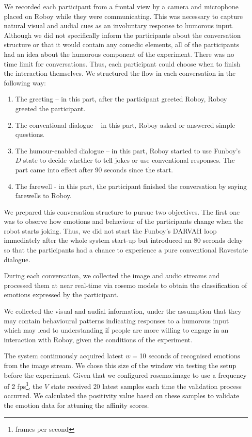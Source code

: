 We recorded each participant from a frontal view by a camera and microphone placed on Roboy while they were communicating. This was necessary to capture natural visual and audial cues as an involuntary response to humorous input. Although we did not specifically inform the participants about the conversation structure or that it would contain any comedic elements, all of the participants had an idea about the humorous component of the experiment.
There was no time limit for conversations. Thus, each participant could choose when to finish the interaction themselves. We structured the flow in each conversation in the following way:
\begin{enumerate}
    \item The greeting – in this part, after the participant greeted Roboy, Roboy greeted the participant.
    \item The conventional dialogue – in this part, Roboy asked or answered simple questions.
    \item The humour-enabled dialogue – in this part, Roboy started to use Funboy's \( D\) state to decide whether to tell jokes or use conventional responses. The part came into effect after 90 seconds since the start.
    \item The farewell - in this part, the participant finished the conversation by saying farewells to Roboy.
\end{enumerate}
We prepared this conversation structure to pursue two objectives. The first one was to observe how emotions and behaviour of the participants change when the robot starts joking. Thus, we did not start the Funboy's DARVAH loop immediately after the whole system start-up but introduced an 80 seconds delay so that the participants had a chance to experience a pure conventional Ravestate dialogue. 
    
During each conversation, we collected the image and audio streams and processed them at near real-time via rosemo models to obtain the classification of emotions expressed by the participant.
    
We collected the visual and audial information, under the assumption that they may contain behavioural patterns indicating responses to a humorous input which may lead to understanding if people are more willing to engage in an interaction with Roboy, given the conditions of the experiment.
 
The system continuously acquired latest \(w=\)10 seconds of recognised emotions from the image stream. We chose this size of the window via testing the setup before the experiment. Given that we configured rosemo.image to use a frequency of 2 fps\footnote{frames per second}, the \( V\) state received 20 latest samples each time the validation process occurred. We calculated the positivity value based on these samples to validate the emotion data for attuning the affinity scores. 

